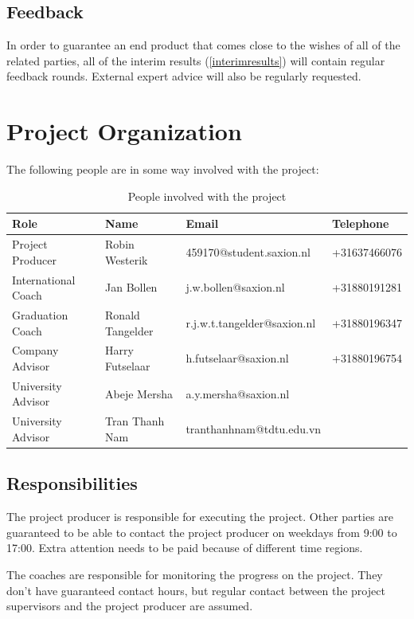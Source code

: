 \documentclass[11pt, a4paper]{article}
\begin{document}
\subsection{Feedback}
In order to guarantee an end product that comes close to the wishes of all of the related parties, all of the interim results (\ref{interimresults}) will contain regular feedback rounds. External expert advice will also be regularly requested.
\pagebreak
\section{Project Organization}\label{projectorganization}
The following people are in some way involved with the project:\\
\begin{table}[h]
    \centering
\begin{tabular}{ | l | l | l | l |}
    \hline
    \textbf{Role} & \textbf{Name} & \textbf{Email} & \textbf{Telephone} \\ \hline
    Project Producer & Robin Westerik & 459170@student.saxion.nl & +31637466076 \\
    International Coach & Jan Bollen & j.w.bollen@saxion.nl & +31880191281\\
    Graduation Coach & Ronald Tangelder & r.j.w.t.tangelder@saxion.nl & +31880196347\\
    Company Advisor & Harry Futselaar & h.futselaar@saxion.nl & +31880196754\\
    University Advisor & Abeje Mersha & a.y.mersha@saxion.nl & \\
    University Advisor & Tran Thanh Nam & tranthanhnam@tdtu.edu.vn & \\
    \hline
\end{tabular}
    \caption{People involved with the project}
\end{table}

\subsection{Responsibilities}
The project producer is responsible for executing the project. Other parties are guaranteed to be able to contact the project producer on weekdays from 9:00 to 17:00. Extra attention needs to be paid because of different time regions.

The coaches are responsible for monitoring the progress on the project. They don't have guaranteed contact hours, but regular contact between the project supervisors and the project producer are assumed.
\end{document}
